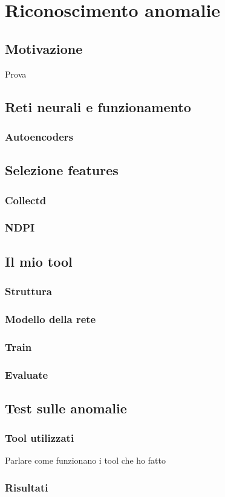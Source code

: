 \chapter{Riconoscimento anomalie}


\section{Motivazione}
Prova 


\section{Reti neurali e funzionamento}



\subsection{Autoencoders}




\section{Selezione features}
\subsection{Collectd}
\subsection{NDPI}

\section{Il mio tool}
\subsection{Struttura}
\subsection{Modello della rete}
\subsection{Train}
\subsection{Evaluate}


\section{Test sulle anomalie}
\subsection{Tool utilizzati}

Parlare come funzionano i tool che ho fatto

\subsection{Risultati}
